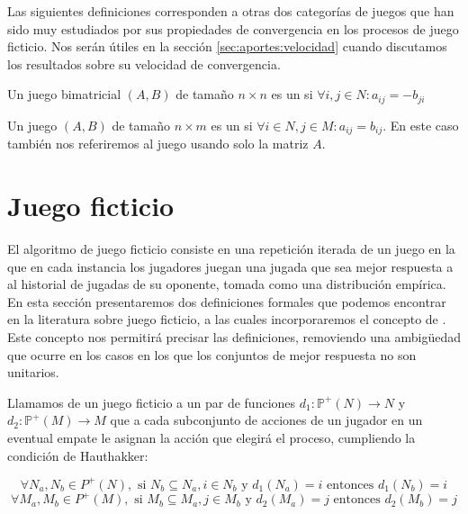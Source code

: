 Las siguientes definiciones corresponden a otras dos categorías de juegos que han sido muy estudiados por sus propiedades de convergencia en los procesos de juego ficticio. Nos serán útiles en la sección \ref{sec:aportes:velocidad} cuando discutamos los resultados sobre su velocidad de convergencia.

\begin{definition}
    Un juego bimatricial $(A, B)$ de tamaño $n \times n$ es un  si $\forall i, j \in N : a_{ij} = -b_{ji}$
\end{definition}

\begin{definition}
    Un juego $(A, B)$ de tamaño $n \times m$ es un  si $\forall i \in N, j \in M : a_{ij} = b_{ij}$. En este caso también nos referiremos al juego usando solo la matriz $A$.
\end{definition}


\section{Juego ficticio} \label{sec:def:fp}

El algoritmo de juego ficticio consiste en una repetición iterada de un juego en la que en cada instancia los jugadores juegan una jugada que sea mejor respuesta a al historial de jugadas de su oponente, tomada como una distribución empírica. En esta sección presentaremos dos definiciones formales que podemos encontrar en la literatura sobre juego ficticio, a las cuales incorporaremos el concepto de . Este concepto nos permitirá precisar las definiciones, removiendo una ambigüedad que ocurre en los casos en los que los conjuntos de mejor respuesta no son unitarios.

\begin{definition}
    Llamamos  de un juego ficticio a un par de funciones $d_1: \mathbb{P}^+(N) \rightarrow N$ y $d_2: \mathbb{P}^+(M) \rightarrow M$ que a cada subconjunto de acciones de un jugador en un eventual empate le asignan la acción que elegirá el proceso, cumpliendo la condición de Hauthakker:

    \[
        \forall N_a, N_b \in {P}^+(N), \text{ si } N_b \subseteq N_a, i \in N_b \text{ y } d_1(N_a) = i  \text{ entonces } d_1(N_b) = i
    \]
    \[
        \forall M_a, M_b \in {P}^+(M), \text{ si } M_b \subseteq M_a, j \in M_b \text{ y } d_2(M_a) = j  \text{ entonces } d_2(M_b) = j
    \]
\end{definition}

